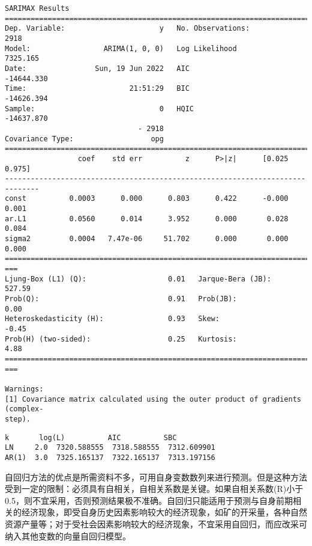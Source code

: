 \documentclass[11pt]{article}
\makeatletter
\newcommand{\boxspacing}{\kern\kvtcb@left@rule\kern\kvtcb@boxsep}
\newcommand{\prompt}[4]{
        {\ttfamily\llap{{\color{#2}[#3]:\hspace{3pt}#4}}\vspace{-\baselineskip}}
    }
\makeatother
\begin{document}
    \begin{Verbatim}[commandchars=\\\{\}]
                               SARIMAX Results
==============================================================================
Dep. Variable:                      y   No. Observations:                 2918
Model:                 ARIMA(1, 0, 0)   Log Likelihood                7325.165
Date:                Sun, 19 Jun 2022   AIC                         -14644.330
Time:                        21:51:29   BIC                         -14626.394
Sample:                             0   HQIC                        -14637.870
                               - 2918
Covariance Type:                  opg
==============================================================================
                 coef    std err          z      P>|z|      [0.025      0.975]
------------------------------------------------------------------------------
const          0.0003      0.000      0.803      0.422      -0.000       0.001
ar.L1          0.0560      0.014      3.952      0.000       0.028       0.084
sigma2         0.0004   7.47e-06     51.702      0.000       0.000       0.000
================================================================================
===
Ljung-Box (L1) (Q):                   0.01   Jarque-Bera (JB):
527.59
Prob(Q):                              0.91   Prob(JB):
0.00
Heteroskedasticity (H):               0.93   Skew:
-0.45
Prob(H) (two-sided):                  0.25   Kurtosis:
4.88
================================================================================
===

Warnings:
[1] Covariance matrix calculated using the outer product of gradients (complex-
step).
    \end{Verbatim}

            \begin{tcolorbox}[breakable, size=fbox, boxrule=.5pt, pad at break*=1mm, opacityfill=0]
\prompt{Out}{outcolor}{3}{\boxspacing}
\begin{Verbatim}[commandchars=\\\{\}]
         k       log(L)          AIC          SBC
LN     2.0  7320.588555  7318.588555  7312.609901
AR(1)  3.0  7325.165137  7322.165137  7313.197156
\end{Verbatim}
\end{tcolorbox}

    自回归方法的优点是所需资料不多，可用自身变数数列来进行预测。但是这种方法受到一定的限制：必须具有自相关，自相关系数是关键。如果自相关系数(R)小于0.5，则不宜采用，否则预测结果极不准确。自回归只能适用于预测与自身前期相关的经济现象，即受自身历史因素影响较大的经济现象，如矿的开采量，各种自然资源产量等；对于受社会因素影响较大的经济现象，不宜采用自回归，而应改采可纳入其他变数的向量自回归模型。
\end{document}
